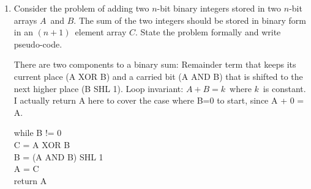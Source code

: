 \documentclass{article}
\newcommand{\?}{\stackrel{?}{=}}
\newcommand\Ans[2][]{%
   \leavevmode\noindent
   {
       \begin{mdframed}[backgroundcolor=blue!10]
       #2
       \end{mdframed}
   }
}
\begin{document}
\begin{enumerate}
	 \newpage
	 \item Consider the problem of adding two $n$-bit binary integers stored in two $n$-bit arrays $A$\ and $B$.  The sum of the two integers should be stored in binary form in an $(n+1)$\ element array $C$.  State the problem formally and write pseudo-code.
	 \Ans{
	 	There are two components to a binary sum:  Remainder term that keeps its current place (A XOR B) and a carried bit (A AND B) that is shifted to the next higher place (B SHL 1).  Loop invariant: $A + B = k$\ where $k$\ is constant. I actually return A here to cover the case where B=0 to start, since A + 0 = A.\\
	     \setlength{\parindent}{5ex}
	     \begin{tt}
	     	while B != 0 \\
	     	\indent C = A XOR B \\
	     	\indent B = (A AND B) SHL 1 \\
	     	\indent A = C \\
	     	return A	
	     \end{tt}
	 }
	 
\end{enumerate}
\end{document}
